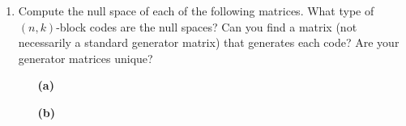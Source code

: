 {\begin{enumerate}
\begin{enumerate}
 \item
$(000000) \; (011100) \; (110101) \; (110001)$
 
 \item
$(0110110) \; (0111100) \; (1110000) \; (1111111)$ \\
$(1001001) \; (1000011) \; (0001111) \; (0000000)$
 
\end{enumerate}
 
 
\item
Compute the null space of each of the following matrices.  What type
of $(n,k)$-block codes are the null spaces? Can you find a matrix (not
necessarily a standard generator matrix) that generates each code?
Are your generator matrices unique?
  
\vspace{3pt}        %
 
\hspace{-7pt}
\begin{minipage}[t]{4.6in}
\noindent
\begin{minipage}[t]{2.25in}
\begin{itemize}
 
 \item[{\bf (a)}]
  
\end{itemize}
\end{minipage} \hfill
\begin{minipage}[t]{2.25in}
\begin{itemize}
 
 \item[{\bf (b)}]
 
\end{itemize}
\end{minipage}
\end{minipage}
 

\end{enumerate}}
